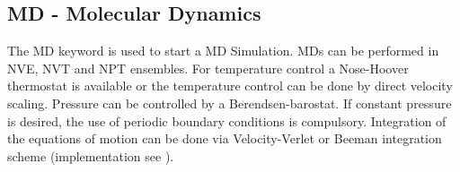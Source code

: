 \documentclass[10pt,a4paper]{article} %
\begin{document}
	\subsection{MD - Molecular Dynamics}
	The MD keyword is used to start a \acf{MD} Simulation\supercite{md_art}. \acp{MD} can be performed in NVE, NVT and NPT ensembles. For temperature control a Nose-Hoover thermostat\supercite{nose,hoover} is available or the temperature control can be done by direct velocity scaling. Pressure can be controlled by a Berendsen-barostat\supercite{berendsen}. If constant pressure is desired, the use of periodic boundary conditions is compulsory. Integration of the equations of motion can be done via Velocity-Verlet or Beeman\supercite{beeman} integration scheme (implementation see \cite{becker_development_2015}). 
\end{document}
